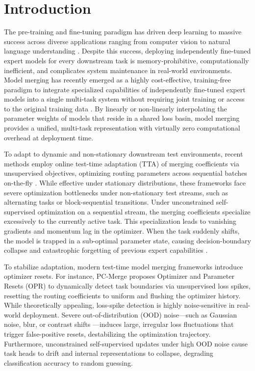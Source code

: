 \documentclass{article}
\theoremstyle{plain}
\theoremstyle{definition}
\theoremstyle{remark}
\begin{document}
\section{Introduction}
\label{sec:intro}
The pre-training and fine-tuning paradigm has driven deep learning to massive success across diverse applications ranging from computer vision to natural language understanding \cite{he16, devlin18, vaswani17, dosovitskiy20}. Despite this success, deploying independently fine-tuned expert models for every downstream task is memory-prohibitive, computationally inefficient, and complicates system maintenance in real-world environments. Model merging has recently emerged as a highly cost-effective, training-free paradigm to integrate specialized capabilities of independently fine-tuned expert models into a single multi-task system without requiring joint training or access to the original training data \cite{wortsman22, ilharco23, matena22, yadav23, yu24}. By linearly or non-linearly interpolating the parameter weights of models that reside in a shared loss basin, model merging provides a unified, multi-task representation with virtually zero computational overhead at deployment time.

To adapt to dynamic and non-stationary downstream test environments, recent methods employ online test-time adaptation (TTA) of merging coefficients via unsupervised objectives, optimizing routing parameters across sequential batches on-the-fly \cite{wang21, yang24, jung25}. While effective under stationary distributions, these frameworks face severe optimization bottlenecks under non-stationary test streams, such as alternating tasks or block-sequential transitions. Under unconstrained self-supervised optimization on a sequential stream, the merging coefficients specialize excessively to the currently active task. This specialization leads to vanishing gradients and momentum lag in the optimizer. When the task suddenly shifts, the model is trapped in a sub-optimal parameter state, causing decision-boundary collapse and catastrophic forgetting of previous expert capabilities \cite{chen22}.

To stabilize adaptation, modern test-time model merging frameworks introduce optimizer resets. For instance, PC-Merge \cite{choi24} proposes Optimizer and Parameter Resets (OPR) to dynamically detect task boundaries via unsupervised loss spikes, resetting the routing coefficients to uniform and flushing the optimizer history. While theoretically appealing, loss-spike detection is highly noise-sensitive in real-world deployment. Severe out-of-distribution (OOD) noise—such as Gaussian noise, blur, or contrast shifts \cite{hendrycks19}—induces large, irregular loss fluctuations that trigger false-positive resets, destabilizing the optimization trajectory. Furthermore, unconstrained self-supervised updates under high OOD noise cause task heads to drift and internal representations to collapse, degrading classification accuracy to random guessing.
\end{document}
